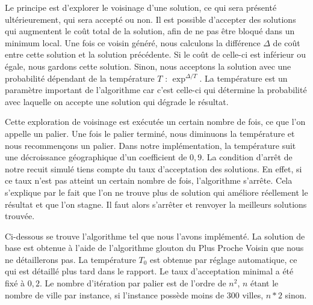 \documentclass{article}
\begin{document}
Le principe est d'explorer le voisinage d'une solution, ce qui sera présenté ultérieurement, qui sera accepté ou non.
Il est possible d'accepter des solutions qui augmentent le coût total de la solution, afin de ne pas être bloqué dans un minimum local.\newline
Une fois ce voisin généré, nous calculons la différence $\Delta$ de coût entre cette solution et la solution précédente.
Si le coût de celle-ci est inférieur ou égale, nous gardons cette solution.
Sinon, nous acceptons la solution avec une probabilité dépendant de la température $T$ : $\exp^{\Delta / T}$.\newline
La température est un paramètre important de l'algorithme car c'est celle-ci qui détermine la probabilité avec laquelle on accepte une solution qui dégrade le résultat.

Cette exploration de voisinage est exécutée un certain nombre de fois, ce que l'on appelle un palier.
Une fois le palier terminé, nous diminuons la température et nous recommençons un palier.
Dans notre implémentation, la température suit une décroissance géographique d'un coefficient de $0,9$.
La condition d'arrêt de notre recuit simulé tiens compte du taux d'acceptation des solutions.
En effet, si ce taux n'est pas atteint un certain nombre de fois, l'algorithme s'arrête.
Cela s'explique par le fait que l'on ne trouve plus de solution qui améliore réellement le résultat et que l'on stagne. Il faut alors s'arrêter et renvoyer la meilleurs solutions trouvée.

Ci-dessous se trouve l'algorithme tel que nous l'avons implémenté.
La solution de base est obtenue à l'aide de l'algorithme glouton du Plus Proche Voisin que nous ne détaillerons pas.
La température $T_0$ est obtenue par réglage automatique, ce qui est détaillé plus tard dans le rapport.
Le taux d'acceptation minimal a été fixé à $0,2$.
Le nombre d'itération par palier est de l'ordre de $n^2$, $n$ étant le nombre de ville par instance, si l'instance possède moins de 300 villes, $n*2$ sinon.
\end{document}
